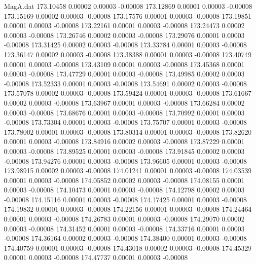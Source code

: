 \begin{filecontents}{MagA.dat}
 173.10458    0.00002    0.00003   -0.00008
 173.12869    0.00001    0.00003   -0.00008
 173.15169    0.00002    0.00003   -0.00008
 173.17576    0.00001    0.00003   -0.00008
 173.19851    0.00001    0.00003   -0.00008
 173.22161    0.00001    0.00003   -0.00008
 173.24473    0.00002    0.00003   -0.00008
 173.26746    0.00002    0.00003   -0.00008
 173.29076    0.00001    0.00003   -0.00008
 173.31425    0.00002    0.00003   -0.00008
 173.33784    0.00001    0.00003   -0.00008
 173.36147    0.00002    0.00003   -0.00008
 173.38388    0.00001    0.00003   -0.00008
 173.40749    0.00001    0.00003   -0.00008
 173.43109    0.00001    0.00003   -0.00008
 173.45368    0.00001    0.00003   -0.00008
 173.47729    0.00001    0.00003   -0.00008
 173.49985    0.00002    0.00003   -0.00008
 173.52333    0.00001    0.00003   -0.00008
 173.54691    0.00002    0.00003   -0.00008
 173.57078    0.00002    0.00003   -0.00008
 173.59424    0.00001    0.00003   -0.00008
 173.61667    0.00002    0.00003   -0.00008
 173.63967    0.00001    0.00003   -0.00008
 173.66284    0.00002    0.00003   -0.00008
 173.68676    0.00001    0.00003   -0.00008
 173.70992    0.00001    0.00003   -0.00008
 173.73304    0.00001    0.00003   -0.00008
 173.75707    0.00001    0.00003   -0.00008
 173.78002    0.00001    0.00003   -0.00008
 173.80314    0.00001    0.00003   -0.00008
 173.82620    0.00001    0.00003   -0.00008
 173.84916    0.00002    0.00003   -0.00008
 173.87229    0.00001    0.00003   -0.00008
 173.89525    0.00001    0.00003   -0.00008
 173.91845    0.00002    0.00003   -0.00008
 173.94276    0.00001    0.00003   -0.00008
 173.96605    0.00001    0.00003   -0.00008
 173.98915    0.00002    0.00003   -0.00008
 174.01241    0.00001    0.00003   -0.00008
 174.03539    0.00001    0.00003   -0.00008
 174.05852    0.00002    0.00003   -0.00008
 174.08155    0.00001    0.00003   -0.00008
 174.10473    0.00001    0.00003   -0.00008
 174.12798    0.00002    0.00003   -0.00008
 174.15116    0.00001    0.00003   -0.00008
 174.17425    0.00001    0.00003   -0.00008
 174.19832    0.00001    0.00003   -0.00008
 174.22156    0.00001    0.00003   -0.00008
 174.24464    0.00001    0.00003   -0.00008
 174.26783    0.00001    0.00003   -0.00008
 174.29070    0.00002    0.00003   -0.00008
 174.31452    0.00001    0.00003   -0.00008
 174.33716    0.00001    0.00003   -0.00008
 174.36164    0.00002    0.00003   -0.00008
 174.38400    0.00001    0.00003   -0.00008
 174.40759    0.00001    0.00003   -0.00008
 174.43018    0.00002    0.00003   -0.00008
 174.45329    0.00001    0.00003   -0.00008
 174.47737    0.00001    0.00003   -0.00008

\end{filecontents}
